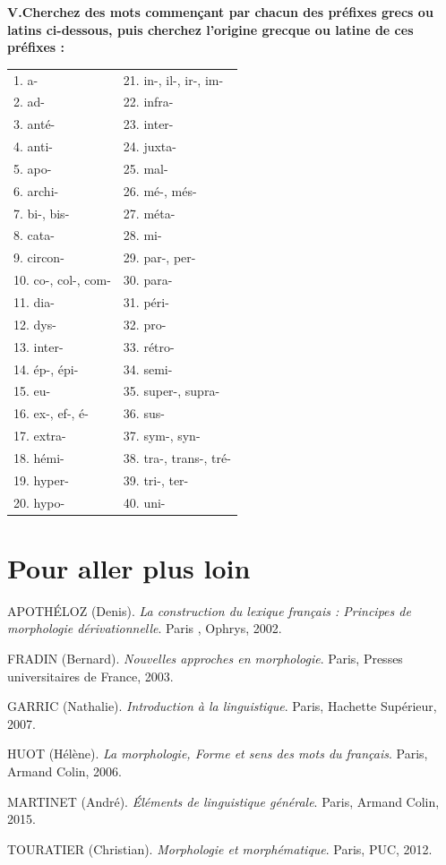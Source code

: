 \textbf{V.\quad Cherchez des mots commençant par chacun des préfixes grecs ou latins ci-dessous, puis cherchez l’origine grecque ou latine de ces préfixes :}
\begin{center}
\begin{tabularx}{.93\linewidth}{@{}XX@{}}
1. a-&21. in-, il-, ir-, im-\\
2. ad-&22. infra-\\
3. anté-&23. inter-\\
4. anti-&24. juxta-\\
5. apo-&25. mal-\\
6. archi-&26. mé-, més-\\
7. bi-, bis-&27. méta-\\
8. cata-&28. mi-\\
9. circon-&29. par-, per-\\
10. co-, col-, com-&30. para-\\
11. dia-&31. péri-\\
12. dys-&32. pro-\\
13. inter-&33. rétro-\\
14. ép-, épi-&34. semi-\\
15. eu-&35. super-, supra-\\
16. ex-, ef-, é-&36. sus-\\
17. extra-&37. sym-, syn-\\
18. hémi-&38. tra-, trans-, tré-\\
19. hyper-&39. tri-, ter-\\
20. hypo-&40. uni-\\
\end{tabularx}
\end{center}

\section*{Pour aller plus loin}\label{ch09-reading}
\begin{small}
\noindent APOTHÉLOZ (Denis). \textit{La construction du lexique français : Principes de morphologie dérivationnelle}. Paris , Ophrys, 2002.\par
\noindent FRADIN (Bernard). \textit{Nouvelles approches en morphologie}. Paris, Presses universitaires de France, 2003.\par
\noindent GARRIC (Nathalie). \textit{Introduction à la linguistique}. Paris, Hachette Supérieur, 2007.\par
\noindent HUOT (Hélène). \textit{La morphologie, Forme et sens des mots du français}. Paris, Armand Colin, 2006.\par
\noindent MARTINET (André). \textit{Éléments de linguistique générale}. Paris, Armand Colin, 2015.\par
\noindent TOURATIER (Christian). \textit{Morphologie et morphématique}. Paris, PUC, 2012.\par
\end{small}

